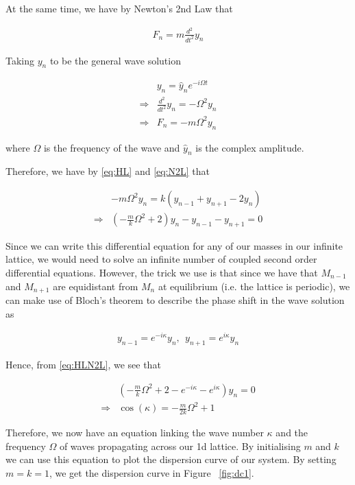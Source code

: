 At the same time, we have by Newton's 2nd Law that

\begin{align}
  F_{n}=m\frac{d^{2}}{dt^{2}}y_{n}
\end{align}

Taking $y_n$ to be the general wave solution

\begin{align}
  &y_{n}=\hat{y}_{n}e^{-i\Omega t} \\
  \Rightarrow &\frac{d^{2}}{dt^{2}}y_{n}=-\Omega^{2}y_{n} \\
  \Rightarrow &F_{n}=-m\Omega^{2}y_{n} \label{eq:N2L}
\end{align}

where $\Omega$ is the frequency of the wave and $\hat{y}_{n}$ is the complex
amplitude.

Therefore, we have by \eqref{eq:HL} and \eqref{eq:N2L} that

\begin{align}
  &-m\Omega^{2}y_{n}=k\left(y_{n-1}+y_{n+1}-2y_{n}\right) \\
  \Rightarrow &\left(-\frac{m}{k}\Omega^{2}+2\right)y_{n}-y_{n-1}-y_{n+1}=0
    \label{eq:HLN2L}
\end{align}

Since we can write this differential equation for any of our masses in our
infinite lattice, we would need to solve an infinite number of coupled second
order differential equations. However, the trick we use is that since we have
that $M_{n-1}$ and $M_{n+1}$ are equidistant from $M_{n}$ at equilibrium (i.e.
the lattice is periodic), we can make use of Bloch's theorem\cite{bloch} to
describe the phase shift in the wave solution as

\begin{align}
  y_{n-1}=e^{-i\kappa}y_n,\ \ y_{n+1}=e^{i\kappa}y_n
\end{align}

Hence, from \eqref{eq:HLN2L}, we see that

\begin{align}
  &\left(-\frac{m}{k}\Omega^{2}+2-e^{-i\kappa}-e^{i\kappa}\right)y_{n}=0 \\
  \Rightarrow &\cos\left(\kappa\right)=-\frac{m}{2k}\Omega^{2}+1
\end{align}

Therefore, we now have an equation linking the wave number $\kappa$ and the
frequency $\Omega$ of waves propagating across our 1d lattice. By initialising
$m$ and $k$ we can use this equation to plot the dispersion curve of our
system. By setting $m=k=1$, we get the dispersion curve in Figure
~\ref{fig:dc1}.

